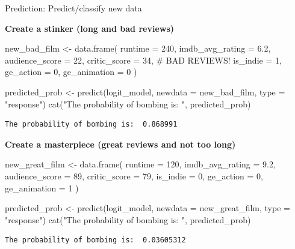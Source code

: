 \documentclass[
  10pt,
  ignorenonframetext,
]{beamer}
\newenvironment{Shaded}{\begin{snugshade}}{\end{snugshade}}
\newcommand{\AttributeTok}[1]{\textcolor[rgb]{0.40,0.45,0.13}{#1}}
\newcommand{\CommentTok}[1]{\textcolor[rgb]{0.37,0.37,0.37}{#1}}
\newcommand{\DecValTok}[1]{\textcolor[rgb]{0.68,0.00,0.00}{#1}}
\newcommand{\FloatTok}[1]{\textcolor[rgb]{0.68,0.00,0.00}{#1}}
\newcommand{\FunctionTok}[1]{\textcolor[rgb]{0.28,0.35,0.67}{#1}}
\newcommand{\NormalTok}[1]{\textcolor[rgb]{0.00,0.23,0.31}{#1}}
\newcommand{\OtherTok}[1]{\textcolor[rgb]{0.00,0.23,0.31}{#1}}
\newcommand{\StringTok}[1]{\textcolor[rgb]{0.13,0.47,0.30}{#1}}
\begin{document}
\begin{frame}[fragile]{Prediction: Predict/classify new data}
\label{prediction-predictclassify-new-data}
\scriptsize

\textbf{Create a stinker (long and bad reviews)}

\begin{Shaded}
\begin{Highlighting}[]
\NormalTok{new\_bad\_film }\OtherTok{\textless{}{-}} \FunctionTok{data.frame}\NormalTok{(}
  \AttributeTok{runtime =} \DecValTok{240}\NormalTok{,  }
  \AttributeTok{imdb\_avg\_rating =} \FloatTok{6.2}\NormalTok{, }\AttributeTok{audience\_score =} \DecValTok{22}\NormalTok{, }\AttributeTok{critic\_score =} \DecValTok{34}\NormalTok{,    }\CommentTok{\# BAD REVIEWS!}
  \AttributeTok{is\_indie =} \DecValTok{1}\NormalTok{, }\AttributeTok{ge\_action =} \DecValTok{0}\NormalTok{, }\AttributeTok{ge\_animation =} \DecValTok{0}
\NormalTok{)}

\NormalTok{predicted\_prob }\OtherTok{\textless{}{-}} \FunctionTok{predict}\NormalTok{(logit\_model, }\AttributeTok{newdata =}\NormalTok{ new\_bad\_film, }\AttributeTok{type =} \StringTok{"response"}\NormalTok{)}
\FunctionTok{cat}\NormalTok{(}\StringTok{"The probability of bombing is: "}\NormalTok{, predicted\_prob)}
\end{Highlighting}
\end{Shaded}

\begin{verbatim}
The probability of bombing is:  0.868991
\end{verbatim}

\textbf{Create a masterpiece (great reviews and not too long)}

\begin{Shaded}
\begin{Highlighting}[]
\NormalTok{new\_great\_film }\OtherTok{\textless{}{-}} \FunctionTok{data.frame}\NormalTok{(}
  \AttributeTok{runtime =} \DecValTok{120}\NormalTok{,  }
  \AttributeTok{imdb\_avg\_rating =} \FloatTok{9.2}\NormalTok{, }\AttributeTok{audience\_score =} \DecValTok{89}\NormalTok{, }\AttributeTok{critic\_score =} \DecValTok{79}\NormalTok{,    }
  \AttributeTok{is\_indie =} \DecValTok{0}\NormalTok{, }\AttributeTok{ge\_action =} \DecValTok{0}\NormalTok{, }\AttributeTok{ge\_animation =} \DecValTok{1}
\NormalTok{)}

\NormalTok{predicted\_prob }\OtherTok{\textless{}{-}} \FunctionTok{predict}\NormalTok{(logit\_model, }\AttributeTok{newdata =}\NormalTok{ new\_great\_film, }\AttributeTok{type =} \StringTok{"response"}\NormalTok{)}
\FunctionTok{cat}\NormalTok{(}\StringTok{"The probability of bombing is: "}\NormalTok{, predicted\_prob)}
\end{Highlighting}
\end{Shaded}

\begin{verbatim}
The probability of bombing is:  0.03605312
\end{verbatim}
\end{frame}
\end{document}
